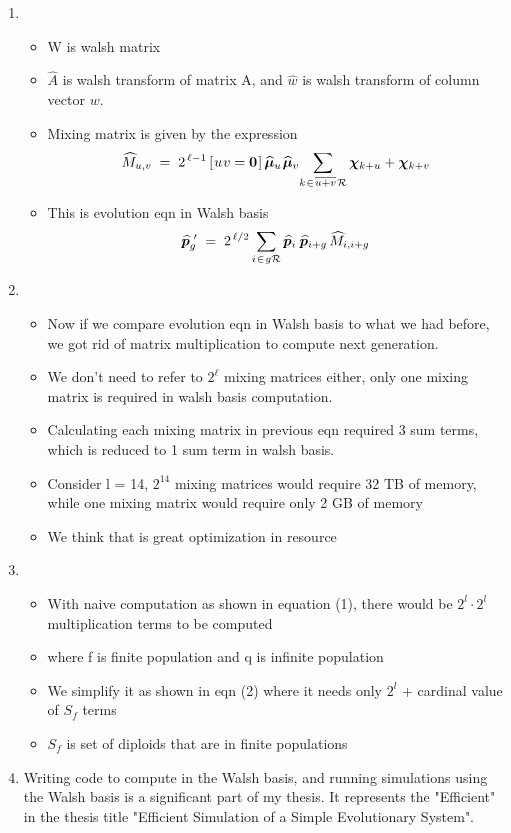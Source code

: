 \documentclass{article}
\newcommand{\nudge}{\hspace{0.01in}}
\begin{document}
\begin{enumerate}
\item
  \begin{itemize}
  \item W is walsh matrix
  \item $\hat{A}$ is walsh transform of matrix A, 
    and $\hat{w}$ is walsh transform of column vector $w$.
  \item Mixing matrix is given by the expression
    \[
      \widehat{M}_{u,v} \; = \; 2^{\,\ell-1} \,[\nudge u \nudge v = {\bf
      0}\nudge]\, \widehat{\bm{\mu}}_u \nudge \widehat{\bm{\mu}}_v \!  \sum_{k
    \nudge \in \nudge \overline{u+v} \nudge \mathcal{R}} \bm{\chi}_{k + u} +
    \bm{\chi}_{k + v}
    \]
  \item This is evolution eqn in Walsh basis 
  \[
    \widehat{\bm{p}}_g^{\,\,\prime} \; = \; 2^{\,\ell/2} \sum_{i \nudge \in \nudge g \mathcal{R}}
    \widehat{\bm{p}}_i \, \nudge \widehat{\bm{p}}_{i+g} \,\widehat{M}_{i,i+g}
  \]  
  \end{itemize}
    
\item
  \begin{itemize}
  \item Now if we compare evolution eqn in Walsh basis to what we had before, we got rid of matrix multiplication to compute next generation. 
  \item We don't need to refer to $2^\ell$ mixing matrices either, only one mixing matrix is required in walsh basis computation.
  \item Calculating each mixing matrix in previous eqn required 3 sum terms, which is reduced to 1 sum term in walsh basis.
  \item Consider l = 14, $2^{14}$ mixing matrices would require 32 TB of
    memory, while one mixing matrix would require only 2 GB of memory
  \item We think that is great optimization in resource
  \end{itemize}
    
\item
  \begin{itemize}
  \item With naive computation as shown in equation (1), there would
    be $2^l \cdot 2^l$ multiplication terms to be computed
  \item where f is finite population and q is infinite population
  \item We simplify it as shown in eqn (2) where it needs only $2^l$ +
    cardinal value of $S_f$ terms
  \item $S_f$ is set of diploids that are in finite populations
  \end{itemize}
  \item Writing code to compute in the Walsh basis, and running simulations using the Walsh basis 
  is a significant part of my thesis. It represents the "Efficient" in the thesis title "Efficient Simulation of a Simple Evolutionary System".
  

\end{enumerate}
\end{document}

